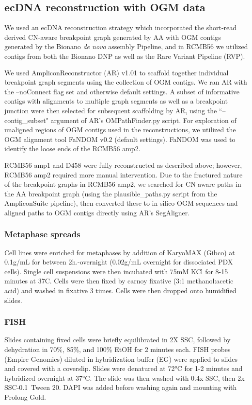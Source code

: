 \subsection{ecDNA reconstruction with OGM data}
We used an ecDNA reconstruction strategy which incorporated the short-read derived CN-aware breakpoint graph generated by AA\cite{AA} with OGM contigs generated by the Bionano \textit{de novo} assembly Pipeline, and in RCMB56 we utilized contigs from both the Bionano DNP as well as the Rare Variant Pipeline (RVP).
\par We used AmpliconReconstructor (AR) v1.01\cite{AR} to scaffold together individual breakpoint graph segments using the collection of OGM contigs. We ran AR with the --noConnect flag set and otherwise default settings. A subset of informative contigs with alignments to multiple graph segments as well as a breakpoint junction were then selected for subsequent scaffolding by AR, using the ``--contig\_subset" argument of AR's OMPathFinder.py script. For exploration of unaligned regions of OGM contigs used in the reconstructions, we utilized the OGM alignment tool FaNDOM\cite{fandom} v0.2 (default settings). FaNDOM was used to identify the loose ends of the RCMB56 amp2. 
\par RCMB56 amp1 and D458 were fully reconstructed as described above; however, RCMB56 amp2 required more manual intervention. Due to the fractured nature of the breakpoint graphs in RCMB56 amp2, we searched for CN-aware paths in the AA breakpoint graph (using the plausible\_paths.py script from the AmpliconSuite pipeline), then converted these to in silico OGM sequences and aligned paths to OGM contigs directly using AR's SegAligner. 

\subsubsection{Metaphase spreads}
Cell lines were enriched for metaphases by addition of KaryoMAX (Gibco) at 0.1\textmugreek g/mL for between 2h.-overnight (0.02\textmugreek g/mL overnight for dissociated PDX cells). Single cell suspensions were then incubated with 75mM KCl for 8-15 minutes at 37\degree C. Cells were then fixed by carnoy fixative (3:1 methanol:acetic acid) and washed in fixative 3 times. Cells were then dropped onto humidified slides.

\subsubsection{\Gls{FISH}}
\label{methods:fish}
Slides containing fixed cells were briefly equilibrated in 2X SSC, followed by dehydration in 70\%, 85\%, and 100\% EtOH for 2 minutes each. FISH probes (Empire Genomics) diluted in hybridization buffer (EG) were applied to slides and covered with a coverslip. Slides were denatured at 72°C for 1-2 minutes and hybridized overnight at 37°C. The slide was then washed with 0.4x SSC, then 2x SSC-0.1\ Tween 20. DAPI was added before washing again and mounting with Prolong Gold.

